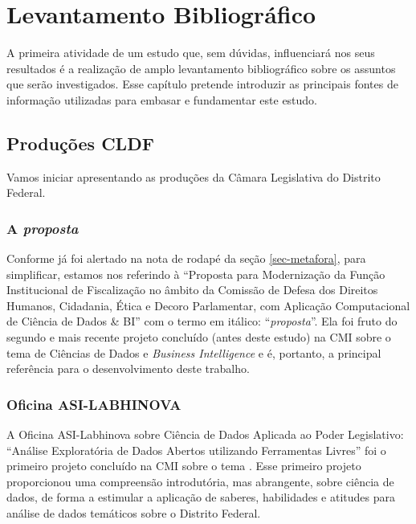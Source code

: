 \chapter{Levantamento Bibliográfico}
\label{cap-literatura}

A primeira atividade de um estudo que, sem dúvidas, influenciará nos seus resultados é a realização de amplo levantamento bibliográfico sobre os assuntos que serão investigados. Esse capítulo pretende introduzir as principais fontes de informação utilizadas para embasar e fundamentar este estudo.

\section{Produções CLDF}

    Vamos iniciar apresentando as produções da Câmara Legislativa do Distrito Federal.

\subsection{A \emph{proposta}}

    Conforme já foi alertado na nota de rodapé da seção \ref{sec-metafora}, para simplificar, estamos nos referindo à ``Proposta para Modernização da Função Institucional de Fiscalização no âmbito da Comissão de Defesa dos Direitos Humanos, Cidadania, Ética e Decoro Parlamentar, com Aplicação Computacional de Ciência de Dados \& BI'' \cite{propostaCDDHCEDP} com o termo em itálico: ``\emph{proposta}''. Ela foi fruto do segundo e mais recente projeto concluído (antes deste estudo) na CMI sobre o tema de Ciências de Dados e \emph{Business Intelligence} e 
    é, portanto, a principal referência para o desenvolvimento deste trabalho.

\subsection{Oficina ASI-LABHINOVA}

    A Oficina ASI-Labhinova sobre Ciência de Dados Aplicada ao Poder Legislativo: ``Análise Exploratória de Dados Abertos utilizando Ferramentas Livres'' foi o primeiro projeto concluído na CMI sobre o tema \cite{asi:oficina}. Esse primeiro projeto proporcionou uma compreensão introdutória, mas abrangente, sobre ciência de dados, de forma a estimular a aplicação de saberes, habilidades e atitudes para análise de dados temáticos sobre o Distrito Federal.


